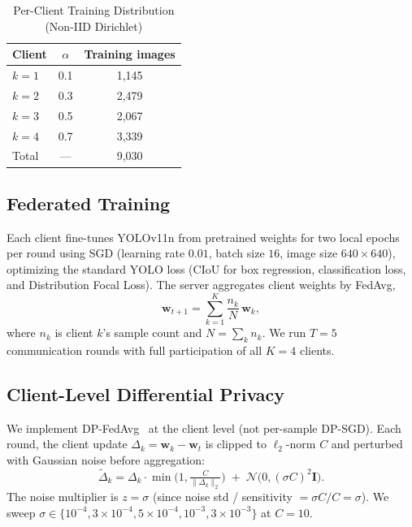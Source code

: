\documentclass[conference]{IEEEtran}
\begin{document}
\begin{table}[t]
\caption{Per-Client Training Distribution (Non-IID Dirichlet)}
\label{tab:clients}
\centering
\begin{tabular}{lcc}
\toprule
\textbf{Client} & \textbf{$\alpha$} & \textbf{Training images} \\
\midrule
$k{=}1$ & 0.1 & 1{,}145 \\
$k{=}2$ & 0.3 & 2{,}479 \\
$k{=}3$ & 0.5 & 2{,}067 \\
$k{=}4$ & 0.7 & 3{,}339 \\
\midrule
Total   & ---  & 9{,}030 \\
\bottomrule
\end{tabular}
\end{table}

\subsection{Federated Training}
Each client fine-tunes YOLOv11n from pretrained weights for two local epochs
per round using SGD (learning rate $0.01$, batch size $16$, image size
$640{\times}640$), optimizing the standard YOLO loss (CIoU for box regression,
classification loss, and Distribution Focal Loss). The server aggregates client
weights by FedAvg,
\begin{equation}
\mathbf{w}_{t+1} = \sum_{k=1}^{K} \frac{n_k}{N}\,\mathbf{w}_k ,
\end{equation}
where $n_k$ is client $k$'s sample count and $N=\sum_k n_k$. We run $T{=}5$
communication rounds with full participation of all $K{=}4$ clients.

\subsection{Client-Level Differential Privacy}
We implement DP-FedAvg~\cite{mcmahan2018learning} at the client level (not
per-sample DP-SGD). Each round, the client update
$\Delta_k=\mathbf{w}_k-\mathbf{w}_t$ is clipped to $\ell_2$-norm $C$ and
perturbed with Gaussian noise before aggregation:
\begin{equation}
\tilde{\Delta}_k = \Delta_k \cdot \min\!\Big(1,\tfrac{C}{\lVert \Delta_k \rVert_2}\Big)
\;+\; \mathcal{N}\!\big(0,(\sigma C)^2 \mathbf{I}\big).
\end{equation}
The noise multiplier is $z{=}\sigma$ (since noise std / sensitivity
$=\sigma C / C=\sigma$). We sweep $\sigma\in\{10^{-4},3{\times}10^{-4},
5{\times}10^{-4},10^{-3},3{\times}10^{-3}\}$ at $C{=}10$.
\end{document}
